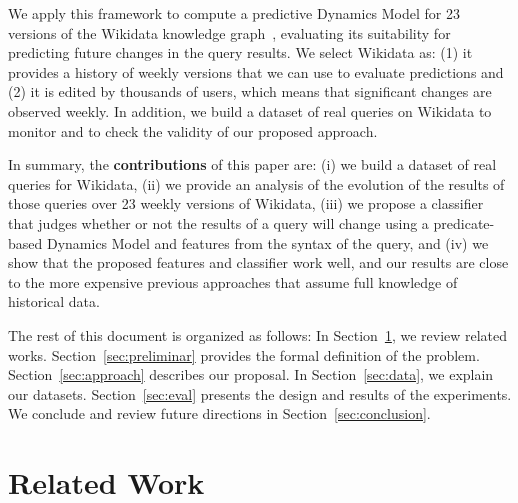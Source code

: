 \documentclass[runningheads]{llncs}
\begin{document}
We apply this framework to compute a predictive Dynamics Model for 23 versions of the Wikidata knowledge graph~\cite{VrandecicK14}, evaluating its suitability for predicting future changes in the query results. We select Wikidata as: (1) it provides a history of weekly versions that we can use to evaluate predictions and (2) it is edited by thousands of users, which means that significant changes are observed weekly. In addition, we build a dataset of real queries on Wikidata to monitor and to check the validity of our proposed approach. 

In summary, the \textbf{contributions} of this paper are: (i) we build a dataset of real queries for Wikidata, (ii) we provide an analysis of the evolution of the results of those queries over 23 weekly versions of Wikidata, (iii) we propose a classifier that judges whether or not the results of a query will change using a predicate-based Dynamics Model and features from the syntax of the query, and (iv) we show that the proposed features and classifier work well, and our results are close to the more expensive previous approaches that assume full knowledge of historical data.

The rest of this document is organized as follows: In Section~\ref{sec:related}, we review related works. Section~\ref{sec:preliminar} provides the formal definition of the problem. Section~\ref{sec:approach} describes our proposal. In Section~\ref{sec:data}, we explain our datasets. Section~\ref{sec:eval} presents the design and results of the experiments. We conclude and review future directions in Section~\ref{sec:conclusion}.


%
\section{Related Work}
\label{sec:related}
%
\end{document}
